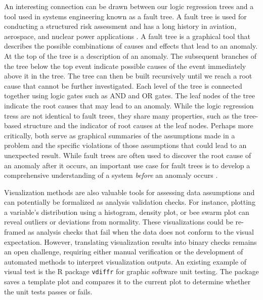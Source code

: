 \documentclass[
  12pt,
]{interact}
\begin{document}
An interesting connection can be drawn between our logic regression
trees and a tool used in systems engineering known as a fault tree. A
fault tree is used for conducting a structured risk assessment and has a
long history in aviation, aerospace, and nuclear power applications
\citep{vesely1981fault}. A fault tree is a graphical tool that describes
the possible combinations of causes and effects that lead to an anomaly.
At the top of the tree is a description of an anomaly. The subsequent
branches of the tree below the top event indicate possible causes of the
event immediately above it in the tree. The tree can then be built
recursively until we reach a root cause that cannot be further
investigated. Each level of the tree is connected together using logic
gates such as AND and OR gates. The leaf nodes of the tree indicate the
root causes that may lead to an anomaly. While the logic regression
tress are not identical to fault trees, they share many properties, such
as the tree-based structure and the indicator of root causes at the leaf
nodes. Perhaps more critically, both serve as graphical summaries of the
assumptions made in a problem and the specific violations of those
assumptions that could lead to an unexpected result. While fault trees
are often used to discover the root cause of an anomaly after it occurs,
an important use case for fault trees is to develop a comprehensive
understanding of a system \emph{before} an anomaly occurs
\citep{michael2002fault}.

Visualization methods are also valuable tools for assessing data
assumptions and can potentially be formalized as analysis validation
checks. For instance, plotting a variable's distribution using a
histogram, density plot, or bee swarm plot can reveal outliers or
deviations from normality. These visualizations could be re-framed as
analysis checks that fail when the data does not conform to the visual
expectation. However, translating visualization results into binary
checks remains an open challenge, requiring either manual verification
or the development of automated methods to interpret visualization
outputs. An existing example of visual test is the R package
\texttt{vdiffr} \citep{vdiffr} for graphic software unit testing. The
package saves a template plot and compares it to the current plot to
determine whether the unit tests passes or fails.
\end{document}
